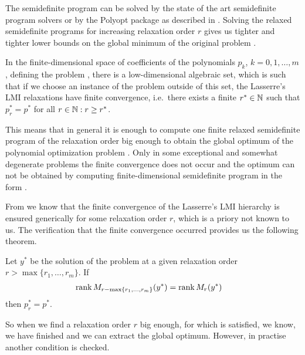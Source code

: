 The semidefinite program  can be solved by the state of the art semidefinite program solvers or by the Polyopt package as described in .
Solving the relaxed semidefinite programs for increasing relaxation order $r$ gives us tighter and tighter lower bounds on the global minimum of the original problem .

\begin{theorem}
  In the finite-dimensional space of coefficients of the polynomials $p_k$, $k = 0, 1, \ldots, m$, defining the problem , there is a low-dimensional algebraic set, which is such that if we choose an instance of the problem  outside of this set, the Lasserre's LMI relaxations have finite convergence, i.e.\ there exists a finite $r^*\in\mathbb{N}$ such that $p^*_r=p^*$ for all $r\in\mathbb{N}: r\geq r^*$.
\end{theorem}

This means that in general it is enough to compute one finite relaxed semidefinite program  of the relaxation order big enough to obtain the global optimum of the polynomial optimization problem .
Only in some exceptional and somewhat degenerate problems the finite convergence does not occur and the optimum can not be obtained by computing finite-dimensional semidefinite program in the form .

From  we know that the finite convergence of the Lasserre's LMI hierarchy is ensured generically for some relaxation order $r$, which is a priory not known to us.
The verification that the finite convergence occurred provides us the following theorem.

\begin{theorem}
  Let $y^*$ be the solution of the problem  at a given relaxation order $r > \max\{r_1,\ldots,r_m\}$.
  If
  \begin{align}
    \operatorname{rank} M_{r-\max\{r_1,\ldots,r_m\}}(y^*) &= \operatorname{rank} M_r(y^*)
  \end{align}
  then $p^*_r = p^*$.
\end{theorem}

So when we find a relaxation order $r$ big enough, for which  is satisfied, we know, we have finished and we can extract the global optimum.
However, in practise another condition is checked.

